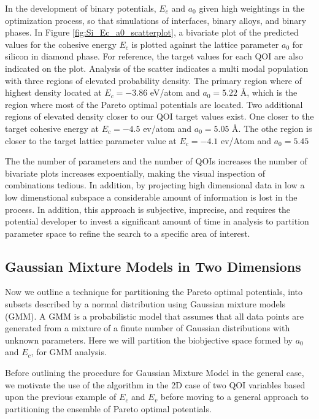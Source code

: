 In the development of binary potentials, $E_c$ and $a_0$ given high weightings in the optimization process, so that simulations of interfaces, binary alloys, and binary phases.
In Figure \ref{fig:Si_Ec_a0_scatterplot}, a bivariate plot of the predicted values for the cohesive energy $E_c$ is plotted against the lattice parameter $a_0$ for silicon in diamond phase.
For reference, the target values for each QOI are also indicated on the plot.  Analysis of the scatter indicates a multi modal population with three regions of elevated probability density.
The primary region where of highest density located at $E_c=-3.86$ eV/atom and $a_0=5.22$ \AA, which is the region where most of the Pareto optimal potentials are located.  Two additional regions of elevated density closer to our QOI target values exist.  One closer to the target cohesive energy at $E_c=-4.5$ ev/atom and $a_0=5.05$ \AA.  The othe region is closer to the target lattice parameter value at $E_c=-4.1$ ev/Atom and $a_0=5.45$

The the number of parameters and the number of QOIs increases the number of bivariate plots increases expoentially, making the visual inspection of combinations tedious.    In addition, by projecting high dimensional data in low a low dimenstional subspace a considerable amount of information is lost in the process.  In addition, this approach is subjective, imprecise, and requires the potential developer to invest a significant amount of time in analysis to partition parameter space to refine the search to a specific area of interest.

\subsection{Gaussian Mixture Models in Two Dimensions}

Now we outline a technique for partitioning the Pareto optimal potentials, into subsets described by a normal distribution using Gaussian mixture models (GMM).  A GMM is a probabilistic model that assumes that all data points are generated from a mixture of a finute number of Gaussian distributions with unknown parameters.  Here we will partition the biobjective space formed by $a_0$ and $E_c$, for GMM analysis.

Before outlining the procedure for Gaussian Mixture Model in the general case, we motivate the use of the algorithm in the 2D case of two QOI variables based upon the previous example of $E_c$ and $E_v$ before moving to a general approach to partitioning the ensemble of Pareto optimal potentials.

